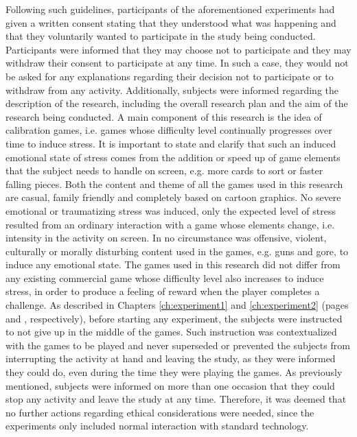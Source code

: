 Following such guidelines, participants of the aforementioned experiments had given a written consent stating that they understood what was happening and that they voluntarily wanted to participate in the study being conducted. Participants were informed that they may choose not to participate and they may withdraw their consent to participate at any time. In such a case, they would not be asked for any explanations regarding their decision not to participate or to withdraw from any activity. Additionally, subjects were informed regarding the description of the research, including the overall research plan and the aim of the research being conducted. A main component of this research is the idea of calibration games, i.e. games whose difficulty level continually progresses over time to induce stress. It is important to state and clarify that such an induced emotional state of stress comes from the addition or speed up of game elements that the subject needs to handle on screen, e.g. more cards to sort or faster falling pieces. Both the content and theme of all the games used in this research are casual, family friendly and completely based on cartoon graphics. No severe emotional or traumatizing stress was induced, only the expected level of stress resulted from an ordinary interaction with a game whose elements change, i.e. intensity in the activity on screen. In no circumstance was offensive, violent, culturally or morally disturbing content used in the games, e.g. guns and gore, to induce any emotional state. The games used in this research did not differ from any existing commercial game whose difficulty level also increases to induce stress, in order to produce a feeling of reward when the player completes a challenge. As described in Chapters \ref{ch:experiment1} and \ref{ch:experiment2} (pages \pageref{ch:experiment1} and \pageref{ch:experiment2}, respectively), before starting any experiment, the subjects were instructed to not give up in the middle of the games. Such instruction was contextualized with the games to be played and never superseded or prevented the subjects from interrupting the activity at hand and leaving the study, as they were informed they could do, even during the time they were playing the games. As previously mentioned, subjects were informed on more than one occasion that they could stop any activity and leave the study at any time. Therefore, it was deemed that no further actions regarding ethical considerations were needed, since the experiments only included normal interaction with standard technology.

